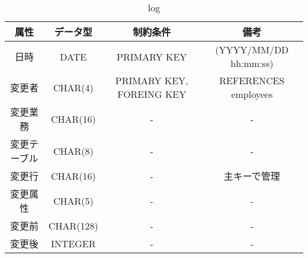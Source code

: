 \begin{table}
\begin{center}
    \begin{tabular}{|c|c|c|c|}
    \hline
    属性       & データ型      &  制約条件     & 備考 \\ \hline \hline
    日時       & DATE          & PRIMARY KEY  &  (YYYY/MM/DD hh:mm:ss) \\ \hline
    変更者     & CHAR(4)       & PRIMARY KEY, FOREING KEY &  REFERENCES employees \\ \hline
    変更業務    & CHAR(16)     &   -          &   - \\ \hline
    変更テーブル    & CHAR(8)      & -            &  - \\ \hline 
    変更行       & CHAR(16)      & -            &  主キーで管理  \\\hline
    変更属性   & CHAR(5)       & -             &  - \\ \hline
    変更前       & CHAR(128)     & -             & - \\  \hline
    変更後   & INTEGER       & -             & - \\   \hline
    \end{tabular}
\label{fig:data_log} 
\caption{log}
\end{center}
\end{table}

